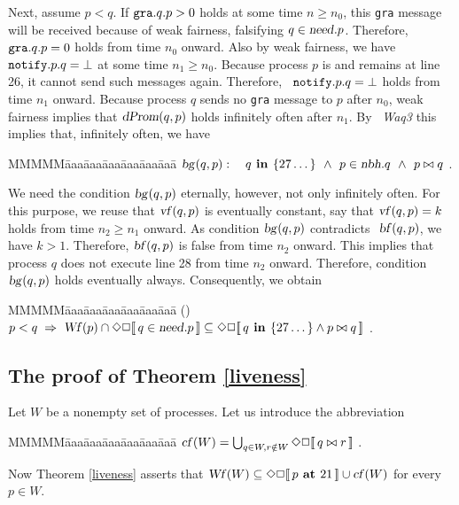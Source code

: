 \documentclass[10pt]{article} \usepackage[english]{babel}
\makeatletter
\newenvironment{tab}{\begin{tabbing}
MMMMM\=aaa\=aaa\=aaa\=aaa\=aaa\=aaa\= \kill}{\end{tabbing}}
\def\refmystepcounter#1{\stepcounter{#1}\protect\gdef 
\@currentlabel {\csname p@#1\endcsname \csname 
the#1\endcsname}}
\newcounter {tabnr}
\newenvironment{tabn}{\begin{tabbing}
\refmystepcounter{tabnr}
MMMMM\=aaa\=aaa\=aaa\=aaa\=aaa\=aaa\= \kill
(\arabic{tabnr})~}{\end{tabbing}}
\def\sem #1{\hbox{$[\![\, #1\, ]\!] $}}
\def\S #1/{\mbox {\textsl{#1}}}
\def\B #1/{\mbox {\textbf{#1}}}
\def\T #1/{\mbox {\texttt{#1}}}
\def\Implies{\;\Rightarrow\;}
\def\Land   {\mbox{ $\;\land\;$ }}
\makeatother
\begin{document}
Next, assume $p < q$.  If $\T gra/.q.p > 0$ holds at some time $n\geq
n_0$, this \T gra/ message will be received because of weak fairness,
falsifying $q\in\S need/.p$. Therefore, $\T gra/.q.p = 0$ holds from
time $n_0$ onward. Also by weak fairness, we have $\T notify/.p.q =
\bot $ at some time $n_1 \geq n_0$. Because process $p$ is and remains
at line 26, it cannot send such messages again. Therefore, $\T
notify/.p.q = \bot $ holds from time $n_1$ onward.  Because process
$q$ sends no \T gra/ message to $p$ after $n_0$, weak fairness implies
that $\S dProm/(q, p)$ holds infinitely often after $n_1$.  By \S
Waq3/ this implies that, infinitely often, we have
\begin{tab}
\>  $ \S bg/(q, p): \quad q\B\ in /\{27\dots\} \Land p\in\S nbh/.q 
\Land p\bowtie q $ .
\end{tab}
We need the condition $\S bg/(q, p)$ eternally, however, not only
infinitely often.  For this purpose, we reuse that $\S vf/(q,p)$ is
eventually constant, say that $\S vf/(q,p) = k$ holds from time
$n_2\geq n_1$ onward. As condition $\S bg/(q,p)$ contradicts $\S
bf/(q,p)$, we have $k >1$.  Therefore, $\S bf/(q,p)$ is false from
time $n_2$ onward. This implies that process $q$ does not execute line
28 from time $n_2$ onward. Therefore, condition $\S bg/(q,p)$ holds
eventually always.  Consequently, we obtain
\begin{tabn} \label{evtHigher} 
  \> $ p < q \Implies \S Wf/(p) \cap \Diamond\Box\sem{q\in \S need/.p}
  \subseteq  \Diamond\Box \sem{q\B\ in /\{27\dots\}\land p\bowtie q} $ .
\end{tabn}

\subsection{The proof of Theorem \ref{liveness}} \label{proofLive}

Let $W$ be a nonempty set of processes. Let us introduce the abbreviation
\begin{tab}
\> $\S cf/(W)=\bigcup_{q\in W,r\notin W} \Diamond\Box\sem{ q\bowtie r} $ .
\end{tab} 
Now Theorem \ref{liveness} asserts that $\S Wf/(W)\subseteq
\Diamond\Box\sem{p\B\ at /21}\cup \S cf/(W)$ for every $p\in W$.
\end{document}
